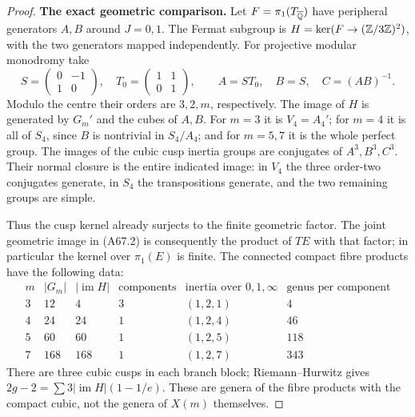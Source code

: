\begin{proof}
\par\smallskip\noindent\textbf{The exact geometric comparison.}\enspace 
Let $F=\pi_1(T_{\overline{\mathbb Q}})$ have peripheral
generators $A,B$ around $J=0,1$.
The Fermat subgroup is
$H=\ker(F\to(\mathbb Z/3\mathbb Z)^2)$, with the two
generators mapped independently.
For projective modular monodromy take
\[
 S=\begin{pmatrix}0&-1\\1&0\end{pmatrix},
 \quad T_0=\begin{pmatrix}1&1\\0&1\end{pmatrix},
 \qquad A=ST_0,\quad B=S,\quad C=(AB)^{-1}.
 \tag{A67.3}
\]
Modulo the centre their orders are $3,2,m$,
respectively. The image of $H$ is generated
by $G_m'$ and the cubes of $A,B$.
For $m=3$ it is $V_4=A_4'$; for $m=4$
it is all of $S_4$, since $B$ is nontrivial
in $S_4/A_4$; and for $m=5,7$ it is the
whole perfect group. The images of the
cubic cusp inertia groups are conjugates
of $A^3,B^3,C^3$. Their normal closure is
the entire indicated image: in $V_4$ the
three order-two conjugates generate, in
$S_4$ the transpositions generate, and
the two remaining groups are simple.

Thus the cusp kernel already surjects to
the finite geometric factor. The joint
geometric image in (A67.2) is consequently
the product of $T E$ with that factor;
in particular the kernel over $\pi_1(E)$
is finite. The connected compact fibre
products have the following data:
\[
\begin{array}{c|r|r|r|c|r}
 m&|G_m|&|\operatorname{im}H|&
 \text{components}&
 \text{inertia over }0,1,\infty&
 \text{genus per component}\\ \hline
 3&12&4&3&(1,2,1)&4\\
 4&24&24&1&(1,2,4)&46\\
 5&60&60&1&(1,2,5)&118\\
 7&168&168&1&(1,2,7)&343
\end{array}
\tag{A67.4}
\]
There are three cubic cusps in each
branch block; Riemann--Hurwitz gives
$2g-2=\sum 3|\operatorname{im}H|(1-1/e)$.
These are genera of the fibre products
with the compact cubic, not the genera
of $X(m)$ themselves.


\end{proof}
